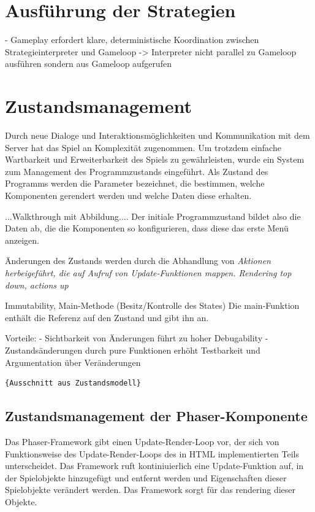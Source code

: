 \section{Ausführung der Strategien}

- Gameplay erfordert klare, deterministische Koordination zwischen Strategieinterpreter und Gameloop
-> Interpreter nicht parallel zu Gameloop ausführen sondern aus Gameloop aufgerufen

\section{Zustandsmanagement}

Durch neue Dialoge und Interaktionsmöglichkeiten und Kommunikation mit dem Server hat das Spiel an
Komplexität zugenommen. Um trotzdem einfache Wartbarkeit und Erweiterbarkeit des Spiels zu
gewährleisten, wurde ein System zum Management des Programmzustands eingeführt. Als Zustand des
Programms werden die Parameter bezeichnet, die bestimmen, welche Komponenten gerendert werden und
welche Daten diese erhalten.

...Walkthrough mit Abbildung.... Der initiale Programmzustand bildet also die Daten ab, die die
Komponenten so konfigurieren, dass diese das erste Menü anzeigen.

Änderungen des Zustands werden durch die Abhandlung von \em{Aktionen} herbeigeführt, die auf Aufruf
von Update-Funktionen mappen. Rendering top down, actions up

Immutability, Main-Methode (Besitz/Kontrolle des States) Die main-Funktion enthält die Referenz auf
den Zustand und gibt ihn an.

Vorteile: - Sichtbarkeit von Änderungen führt zu hoher Debugability - Zustandsänderungen durch pure
Funktionen erhöht Testbarkeit und Argumentation über Veränderungen


\begin{lstlisting}{Ausschnitt aus Zustandsmodell} \end{lstlisting}

\subsection{Zustandsmanagement der Phaser-Komponente}

Das Phaser-Framework gibt einen Update-Render-Loop vor, der sich von Funktionsweise des
Update-Render-Loops des in HTML implementierten Teils unterscheidet. Das Framework ruft
kontiniuierlich eine Update-Funktion auf, in der Spielobjekte hinzugefügt und entfernt werden und
Eigenschaften dieser Spielobjekte verändert werden. Das Framework sorgt für das rendering dieser
Objekte.

